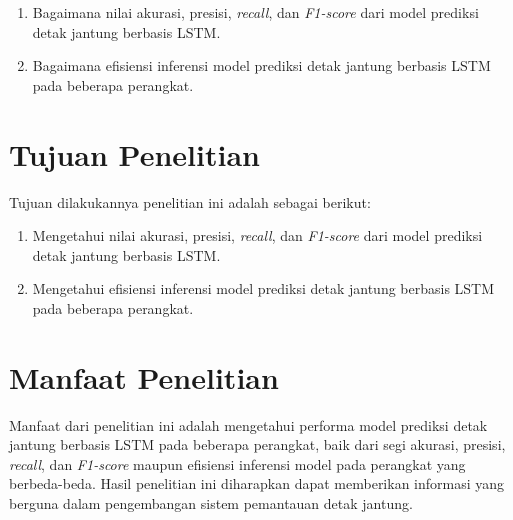 \begin{enumerate}
  \item Bagaimana nilai akurasi, presisi, \emph{recall}, dan \emph{F1-score} dari model prediksi detak jantung berbasis LSTM.
  \item Bagaimana efisiensi inferensi model prediksi detak jantung berbasis LSTM pada beberapa perangkat.
\end{enumerate}


\section{Tujuan Penelitian}
Tujuan dilakukannya penelitian ini adalah sebagai berikut:

\begin{enumerate}
  \item Mengetahui nilai akurasi, presisi, \emph{recall}, dan \emph{F1-score} dari model prediksi detak jantung berbasis LSTM.
  \item Mengetahui efisiensi inferensi model prediksi detak jantung berbasis LSTM pada beberapa perangkat.
\end{enumerate}


\section{Manfaat Penelitian}

Manfaat dari penelitian ini adalah mengetahui performa model prediksi detak jantung berbasis LSTM pada beberapa perangkat, baik dari segi akurasi, presisi, \emph{recall}, dan \emph{F1-score} maupun efisiensi inferensi model pada perangkat yang berbeda-beda. Hasil penelitian ini diharapkan dapat memberikan informasi yang berguna dalam pengembangan sistem pemantauan detak jantung.


